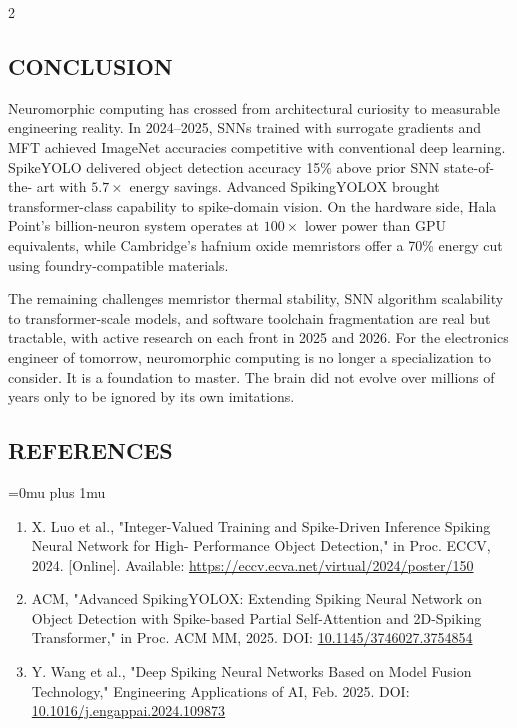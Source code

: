 \begin{multicols}{2}
  \subsection*{\centering\uppercase{Conclusion}}
  Neuromorphic computing has crossed from architectural curiosity to measurable engineering reality. In 2024--2025,
  SNNs trained with surrogate gradients and MFT achieved ImageNet accuracies competitive with
  conventional deep learning. SpikeYOLO delivered object detection accuracy 15\% above prior SNN state-of-the-
  art with \(5.7\times\) energy savings. Advanced SpikingYOLOX brought transformer-class capability to spike-domain
  vision. On the hardware side, Hala Point's billion-neuron system operates at \(100\times\) lower power than GPU
  equivalents, while Cambridge's hafnium oxide memristors offer a 70\% energy cut using foundry-compatible
  materials.

  \noindent
  The remaining challenges memristor thermal stability, SNN algorithm scalability to transformer-scale models,
  and software toolchain fragmentation are real but tractable, with active research on each front in 2025 and 2026.
  For the electronics engineer of tomorrow, neuromorphic computing is no longer a specialization to consider. It is
  a foundation to master. The brain did not evolve over millions of years only to be ignored by its own imitations.

  \subsection*{\centering\uppercase{References}}
  \begin{justify}
  \Urlmuskip=0mu plus 1mu\relax
  \begin{enumerate}
    \item X. Luo et al., "Integer-Valued Training and Spike-Driven Inference Spiking Neural Network for High-
      Performance Object Detection," in Proc. ECCV, 2024. [Online]. Available:
      \url{https://eccv.ecva.net/virtual/2024/poster/150}

    \item ACM, "Advanced SpikingYOLOX: Extending Spiking Neural Network on Object Detection with
      Spike-based Partial Self-Attention and 2D-Spiking Transformer," in Proc. ACM MM, 2025. DOI:
      \url{10.1145/3746027.3754854}

    \item Y. Wang et al., "Deep Spiking Neural Networks Based on Model Fusion Technology," Engineering
      Applications of AI, Feb. 2025. DOI: \url{10.1016/j.engappai.2024.109873}


\end{enumerate}
\end{justify}
\end{multicols}

